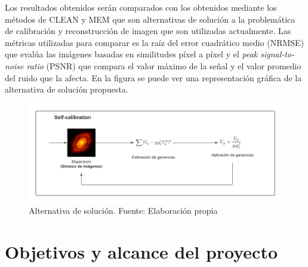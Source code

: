 Los resultados obtenidos serán comparados con los obtenidos mediante los métodos de CLEAN y MEM que son alternativas de solución a la problemática de calibración y reconstrucción de imagen que son utilizadas actualmente. Las métricas utilizadas para comparar es la raíz del error cuadrático medio (NRMSE) que evalúa las imágenes basadas en similitudes píxel a píxel y el \textit{peak signal-to-noise ratio} (PSNR) que compara el valor máximo de la señal y el valor promedio del ruido que la afecta. En la figura  se puede ver una representación gráfica de la alternativa de solución propuesta.

\begin{figure}[!ht]
	\centering
	\captionsetup{justification=centering}
	\includegraphics[scale=0.6]{images/solucion.png}
	\caption[Alternativa de solución]{Alternativa de solución. Fuente: Elaboración propia}
	\label{fig:solucion}
\end{figure}

\section{Objetivos y alcance del proyecto}
\label{intro:objetivos}

